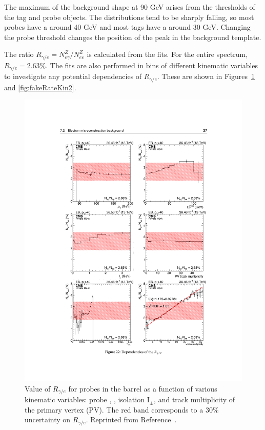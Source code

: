 The maximum of the background shape at 90 GeV arises from the \pT thresholds of the tag and probe objects. The \pT distributions tend to be sharply falling, so most probes have a \pT around 40 GeV and most tags have a \pT around 30 GeV. Changing the probe \pT threshold changes the position of the peak in the background template.

The ratio $R_{\gamma/e} = N_{e\gamma}^Z/N_{ee}^Z$ is calculated from the fits. For the entire spectrum, $R_{\gamma/e} = 2.63\%$. The fits are also performed in bins of different kinematic variables to investigate any potential dependencies of $R_{\gamma/e}$. These are shown in Figures~\ref{fig:fakeRateKin1} and \ref{fig:fakeRateKin2}. 

\begin{figure}[h]
\begin{center}
\includegraphics[width=\textwidth]{Figures/DataAnalysis/fakeKin1.pdf}
\end{center}
\caption[Value of $R_{\gamma/e}$ for probes in the barrel as a function of various kinematic variables: 
probe \pT, \ETmiss, isolation I$_{\pm}$, 
and track multiplicity of the primary vertex.]
{Value of $R_{\gamma/e}$ for probes in the barrel as a function of various kinematic variables: 
probe \pT, \ETmiss, isolation I$_{\pm}$, 
and track multiplicity of the primary vertex (PV). The red band corresponds to a 30\% uncertainty 
on $R_{\gamma/e}$. Reprinted from Reference~\cite{KnutAN}.
}
\label{fig:fakeRateKin1}
\end{figure}

